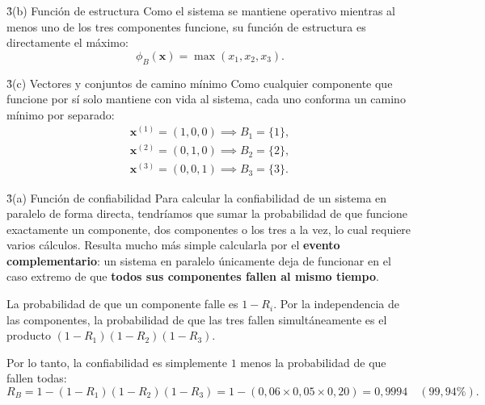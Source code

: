 \documentclass[main.tex]{subfiles}%
\begin{document}
\h3{(b) Función de estructura}
Como el sistema se mantiene operativo mientras al menos uno de los tres componentes funcione, su función de estructura es directamente el máximo:
\begin{equation*}
    \phi_B(\mathbf{x}) = \max(x_1, x_2, x_3).
\end{equation*}

\h3{(c) Vectores y conjuntos de camino mínimo}
Como cualquier componente que funcione por sí solo mantiene con vida al sistema, cada uno conforma un camino mínimo por separado:
\begin{gather*}
    \mathbf{x}^{(1)} = (1, 0, 0) \implies B_1 = \{1\}, \\
    \mathbf{x}^{(2)} = (0, 1, 0) \implies B_2 = \{2\}, \\
    \mathbf{x}^{(3)} = (0, 0, 1) \implies B_3 = \{3\}.
\end{gather*}

\h3{(a) Función de confiabilidad}
Para calcular la confiabilidad de un sistema en paralelo de forma directa, tendríamos que sumar la probabilidad de que funcione exactamente un componente, dos componentes o los tres a la vez, lo cual requiere varios cálculos. Resulta mucho más simple calcularla por el \textbf{evento complementario}: un sistema en paralelo únicamente deja de funcionar en el caso extremo de que \textbf{todos sus componentes fallen al mismo tiempo}.

La probabilidad de que un componente falle es $1 - R_i$. Por la independencia de las componentes, la probabilidad de que las tres fallen simultáneamente es el producto $(1 - R_1)(1 - R_2)(1 - R_3)$.

Por lo tanto, la confiabilidad es simplemente $1$ menos la probabilidad de que fallen todas:
\begin{equation*}
    R_B = 1 - (1 - R_1)(1 - R_2)(1 - R_3) = 1 - (0{,}06 \times 0{,}05 \times 0{,}20) = 0{,}9994 \quad (99{,}94\%).
\end{equation*}


\newpage
{}
\end{document}
